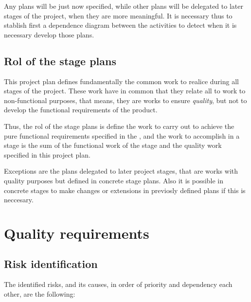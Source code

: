\documentclass[twocolumn]{article}
\begin{document}
Any plans will be just now specified, while other plans will be
delegated to later stages of the project, when they are more
meaningful. It is necessary thus to stablish first a dependence
diagram between the activities to detect when it is necessary
develop those plans.

\subsection{Rol of the stage plans}
This project plan defines fundamentally the common work to realice
during all stages of the project. These work have in common that they
relate all to work to non-functional purposes, that means, they are
works to ensure \textit{quality}, but not to develop the functional
requirements of the product.

Thus, the rol of the stage plans is define the work to carry out to
achieve the pure functional requirements specified in the \favc, and
the work to accomplish in a stage is the sum of the functional work of
the stage and the quality work specified in this project plan.

Exceptions are the plans delegated to later project stages, that
are works with quality purposes but defined in concrete stage
plans. Also it is possible in concrete stages to make changes or
extensions in previosly defined plans if this is neccesary.


\section{Quality requirements}
\subsection{Risk identification}
The identified risks, and its causes, in order of priority and dependency
each other, are the following:
\end{document}

